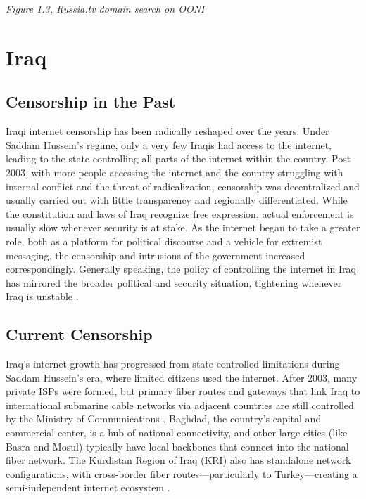 \centerline{\textit{Figure 1.3, Russia.tv domain search on OONI}}

\section{Iraq}

\subsection{Censorship in the Past}

Iraqi internet censorship has been radically reshaped over the years. Under Saddam Hussein's regime, only a very few Iraqis had access to the internet, leading to the state controlling all parts of the internet within the country. Post-2003, with more people accessing the internet and the country struggling with internal conflict and the threat of radicalization, censorship was decentralized and usually carried out with little transparency and regionally differentiated. While the constitution and laws of Iraq recognize free expression, actual enforcement is usually slow whenever security is at stake. As the internet began to take a greater role, both as a platform for political discourse and a vehicle for extremist messaging, the censorship and intrusions of the government increased correspondingly. Generally speaking, the policy of controlling the internet in Iraq has mirrored the broader political and security situation, tightening whenever Iraq is unstable \cite{freedomhouseIraqFreedom}.

\subsection{Current Censorship}

Iraq's internet growth has progressed from state-controlled limitations during Saddam Hussein's era, where limited citizens used the internet. After 2003, many private ISPs were formed, but primary fiber routes and gateways that link Iraq to international submarine cable networks via adjacent countries are still controlled by the Ministry of Communications \cite{IraqCMC}. Baghdad, the country's capital and commercial center, is a hub of national connectivity, and other large cities (like Basra and Mosul) typically have local backbones that connect into the national fiber network. The Kurdistan Region of Iraq (KRI) also has standalone network configurations, with cross-border fiber routes—particularly to Turkey—creating a semi-independent internet ecosystem \cite{freedomhouseIraqFreedom}. 

